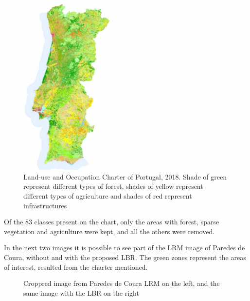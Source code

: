 \begin{figure}[H]
\centering
\includegraphics[height=9cm]{images/carta/cartaPortugal.png}
\caption{Land-use and Occupation Charter of Portugal, 2018. Shade of green represent different types of forest, shades of yellow represent different types of agriculture and shades of red represent infrastructures}
\end{figure}

Of the 83 classes present on the chart, only the areas with forest, sparse vegetation and agriculture were kept, and all the others were removed.

In the next two images it is possible to see part of the LRM image of Paredes de Coura, without and with the proposed LBR. The green zones represent the areas of interest, resulted from the charter mentioned.


\begin{figure}[H]
    \centering
    \qquad
    \caption{Croppred image from Paredes de Coura LRM on the left, and the same image with the LBR on the right}%
\end{figure}

